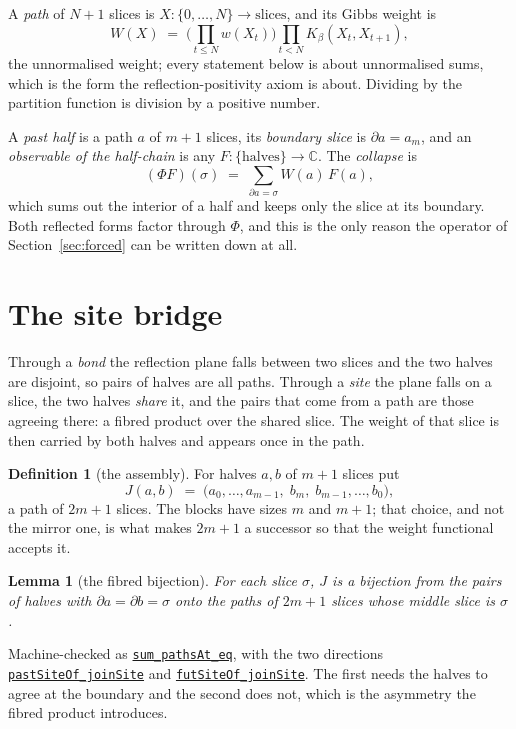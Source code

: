 \documentclass[11pt]{article}
\newtheorem{lemma}[theorem]{Lemma}
\theoremstyle{definition}
\newtheorem{definition}[theorem]{Definition}
\newcommand{\anchor}{c90dc745ab8cd1ba7ddc02aa16fed3de339bf958}
\newcommand{\osline}[3]{%
  \href{https://github.com/lluiseriksson/THE-ERIKSSON-PROGRAMME/blob/\anchor/YangMills/OS/#1.lean\#L#2}{\nolinkurl{#3}}}
\newcommand{\C}{\mathbb{C}}
\begin{document}
A \emph{path} of $N+1$ slices is $X:\{0,\dots,N\}\to\text{slices}$, and its
Gibbs weight is
\[
  W(X)\;=\;\Big(\prod_{t\le N}w(X_t)\Big)\prod_{t<N}K_\beta(X_t,X_{t+1}),
\]
the unnormalised weight; every statement below is about unnormalised sums, which
is the form the reflection-positivity axiom is about.  Dividing by the partition
function is division by a positive number.

A \emph{past half} is a path $a$ of $m+1$ slices, its \emph{boundary slice} is
$\partial a=a_m$, and an \emph{observable of the half-chain} is any
$F:\{\text{halves}\}\to\C$.  The \emph{collapse} is
\[
  (\Phi F)(\sigma)\;=\;\sum_{\partial a=\sigma}W(a)\,F(a),
\]
which sums out the interior of a half and keeps only the slice at its boundary.
Both reflected forms factor through $\Phi$, and this is the only reason the
operator of Section~\ref{sec:forced} can be written down at all.

\section{The site bridge}\label{sec:sitebridge}

Through a \emph{bond} the reflection plane falls between two slices and the two
halves are disjoint, so pairs of halves are all paths.  Through a \emph{site}
the plane falls on a slice, the two halves \emph{share} it, and the pairs that
come from a path are those agreeing there: a fibred product over the shared
slice.  The weight of that slice is then carried by both halves and appears once
in the path.

\begin{definition}[the assembly]
For halves $a,b$ of $m+1$ slices put
\[
  J(a,b)\;=\;\big(a_0,\dots,a_{m-1},\;b_m,\;b_{m-1},\dots,b_0\big),
\]
a path of $2m+1$ slices.  The blocks have sizes $m$ and $m+1$; that choice, and
not the mirror one, is what makes $2m+1$ a successor so that the weight
functional accepts it.
\end{definition}

\begin{lemma}[the fibred bijection]\label{lem:sitebij}
For each slice $\sigma$, $J$ is a bijection from the pairs of halves with
$\partial a=\partial b=\sigma$ onto the paths of $2m+1$ slices whose middle
slice is $\sigma$.
\end{lemma}

Machine-checked as \osline{SpatialOS}{1051}{sum\_pathsAt\_eq}, with the
two directions
\osline{SpatialOS}{911}{pastSiteOf\_joinSite} and
\osline{SpatialOS}{903}{futSiteOf\_joinSite}.  The first needs the
halves to agree at the boundary and the second does not, which is the
asymmetry the fibred product introduces.
\end{document}
